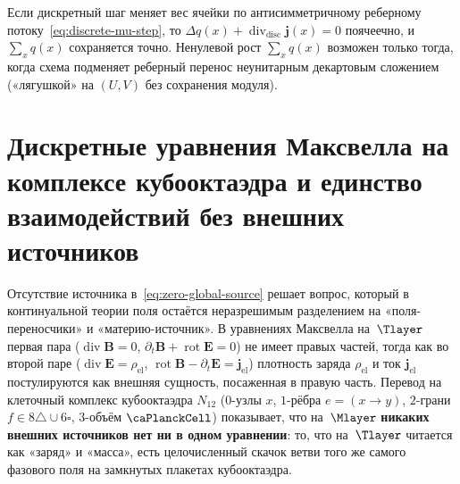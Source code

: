 \begin{proposition}
\label{prop:source-or-flux}
Если дискретный шаг меняет вес ячейки по антисимметричному реберному потоку~\eqref{eq:discrete-mu-step},
то $\Delta q(x)+\operatorname{div}_{\mathrm{disc}}\mathbf{j}(x)=0$ поячеечно, и $\sum_x q(x)$ сохраняется точно.
Ненулевой рост $\sum_x q(x)$ возможен только тогда, когда схема подменяет реберный перенос
неунитарным декартовым сложением («лягушкой» на $(U,V)$ без сохранения модуля).
\end{proposition}

\section{Дискретные уравнения Максвелла на комплексе кубооктаэдра и единство взаимодействий без внешних источников}
\label{sec:discrete-maxwell-unification}

Отсутствие источника в~\eqref{eq:zero-global-source} решает вопрос, который в континуальной теории поля
остаётся неразрешимым разделением на «поля-переносчики» и «материю-источник».
В уравнениях Максвелла на~$\Tlayer$ первая пара ($\operatorname{div}\mathbf{B}=0$, $\partial_t\mathbf{B}+\operatorname{rot}\mathbf{E}=0$)
не имеет правых частей, тогда как во второй паре ($\operatorname{div}\mathbf{E}=\rho_{\mathrm{el}}$,
$\operatorname{rot}\mathbf{B}-\partial_t\mathbf{E}=\mathbf{j}_{\mathrm{el}}$) плотность заряда $\rho_{\mathrm{el}}$
и ток $\mathbf{j}_{\mathrm{el}}$ постулируются как внешняя сущность, посаженная в правую часть.
Перевод на клеточный комплекс кубооктаэдра $N_{12}$ ($0$-узлы $x$, $1$-рёбра $e=(x\to y)$,
$2$-грани $f\in 8\triangle\cup 6\square$, $3$-объём $\PlanckCell$) показывает, что на~$\Mlayer$
\textbf{никаких внешних источников нет ни в одном уравнении}: то, что на~$\Tlayer$ читается как «заряд» и «масса»,
есть целочисленный скачок ветви того же самого фазового поля на замкнутых плакетах кубооктаэдра.


